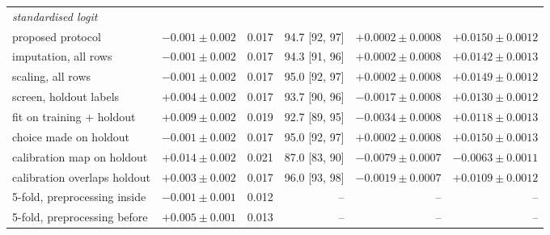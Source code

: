 \begin{table}[htbp]
{\begin{tabular}{lrrrrr}
\multicolumn{6}{l}{\textit{standardised logit}} \\
proposed protocol & $-0.001\pm0.002$ & 0.017 & 94.7 [92, 97] & $+0.0002\pm0.0008$ & $+0.0150\pm0.0012$ \\
imputation, all rows & $-0.001\pm0.002$ & 0.017 & 94.3 [91, 96] & $+0.0002\pm0.0008$ & $+0.0142\pm0.0013$ \\
scaling, all rows & $-0.001\pm0.002$ & 0.017 & 95.0 [92, 97] & $+0.0002\pm0.0008$ & $+0.0149\pm0.0012$ \\
screen, holdout labels & $+0.004\pm0.002$ & 0.017 & 93.7 [90, 96] & $-0.0017\pm0.0008$ & $+0.0130\pm0.0012$ \\
fit on training + holdout & $+0.009\pm0.002$ & 0.019 & 92.7 [89, 95] & $-0.0034\pm0.0008$ & $+0.0118\pm0.0013$ \\
choice made on holdout & $-0.001\pm0.002$ & 0.017 & 95.0 [92, 97] & $+0.0002\pm0.0008$ & $+0.0150\pm0.0013$ \\
calibration map on holdout & $+0.014\pm0.002$ & 0.021 & 87.0 [83, 90] & $-0.0079\pm0.0007$ & $-0.0063\pm0.0011$ \\
calibration overlaps holdout & $+0.003\pm0.002$ & 0.017 & 96.0 [93, 98] & $-0.0019\pm0.0007$ & $+0.0109\pm0.0012$ \\
5-fold, preprocessing inside & $-0.001\pm0.001$ & 0.012 & -- & -- & -- \\
5-fold, preprocessing before & $+0.005\pm0.001$ & 0.013 & -- & -- & -- \\
\bottomrule
\end{tabular}%
}
\end{table}
